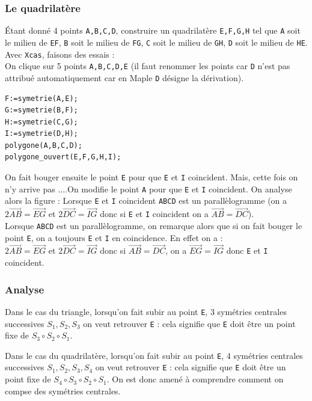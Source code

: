 \documentclass[a4paper,11pt]{book}
\begin{document}
\subsubsection{Le quadrilat\`ere}
\'Etant donn\'e 4 points {\tt A,B,C,D}, construire un  quadrilat\`ere
 {\tt E,F,G,H} tel que {\tt A} soit le milieu de {\tt EF},
{\tt B} soit le milieu de {\tt FG}, {\tt C} soit le milieu de {\tt GH},
{\tt D} soit le milieu de {\tt HE}.\\
Avec {\tt Xcas}, faisons des essais :\\
On clique sur 5 points {\tt A,B,C,D,E} (il faut renommer les points car {\tt D}
n'est pas attribu\'e automatiquement car en Maple {\tt D} d\'esigne la 
d\'erivation). 
\begin{verbatim}
F:=symetrie(A,E);
G:=symetrie(B,F);
H:=symetrie(C,G);
I:=symetrie(D,H);
polygone(A,B,C,D);
polygone_ouvert(E,F,G,H,I);
\end{verbatim} 
On fait bouger ensuite le point {\tt E} pour que {\tt E} et {\tt I} coincident.
Mais, cette fois on n'y arrive pas ....On modifie le point
{\tt A} pour que {\tt E} et {\tt I} coincident. On analyse alors la figure :
Lorsque {\tt E} et {\tt I} coincident {\tt ABCD} est un parall\`elogramme 
(on a $2\overrightarrow{AB}=\overrightarrow{EG}$ et $2\overrightarrow{DC}=\overrightarrow{IG}$ donc si {\tt E} et {\tt I} coincident on a $\overrightarrow{AB}=\overrightarrow{DC}$).\\
Lorsque {\tt ABCD} est un parall\`elogramme, on remarque alors que si on 
fait bouger le point {\tt E}, on a toujours {\tt E} et {\tt I} en coincidence.
 En effet on a :\\
$2\overrightarrow{AB}=\overrightarrow{EG}$ et $2\overrightarrow{DC}=\overrightarrow{IG}$ donc si  $\overrightarrow{AB}=\overrightarrow{DC}$, on a
$\overrightarrow{EG}=\overrightarrow{IG}$ donc {\tt E} et {\tt I} coincident.
\subsubsection{Analyse}
Dans le cas du triangle, lorsqu'on fait subir au point {\tt E}, 3 sym\'etries 
centrales successives $S_1,S_2,S_3$ on veut retrouver {\tt E} : cela signifie 
que {\tt E} doit \^etre un point fixe de $S_3 \circ S_2 \circ S_1$.

Dans le cas du quadrilat\`ere, lorsqu'on fait subir au point {\tt E}, 4 
sym\'etries centrales successives $S_1,S_2,S_3,S_4$ on veut retrouver {\tt E} :
 cela signifie que {\tt E} doit \^etre un point fixe de $S_4 \circ S_3 \circ S_2 \circ S_1$.
On est donc amen\'e \`a comprendre comment on compse des sym\'etries centrales.
\end{document}
